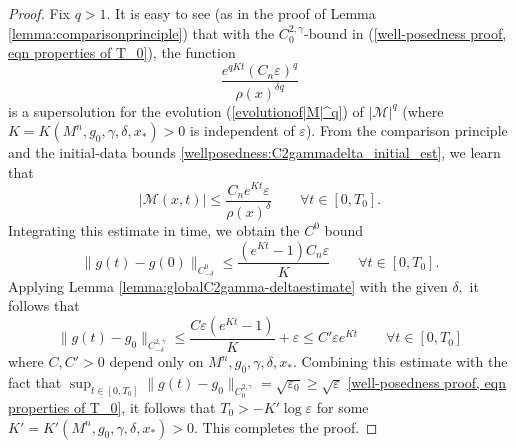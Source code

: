 \documentclass[12pt]{amsart}
\newcommand{\calM}{\mathcal{M}}
\newcommand{\LB}{\left[}
\newcommand{\RB}{\right]}
\renewcommand{\1}{{\mathbf 1}}
\newcommand{\eps}{{\varepsilon}}
\theoremstyle{others}
\numberwithin{equation}{section}
\begin{document}
\begin{proof}
    Fix $q > 1.$ It is easy to see (as in the proof of Lemma \ref{lemma:comparisonprinciple}) that with the $C^{2, \gamma}_0$-bound in (\ref{well-posedness proof, eqn properties of T_0}), the function
        $$\frac{e^{q Kt} (C_n\eps)^q}{\rho(x)^{\delta q }}$$
    is a supersolution for the evolution (\ref{evolutionof|M|^q}) of $|\mathcal{M}|^q$ (where $K = K( M^n, g_0, \gamma, \delta, x_*) > 0$ is independent of $\eps$).
    From the comparison principle and the initial-data bounds \eqref{wellposedness:C2gammadelta_initial_est}, we learn that
        $$| \calM (x,t)| \leq \frac{C_n e^{Kt} \eps}{\rho(x)^{\delta}} \qquad \forall t \in [0, T_0].$$
    Integrating this estimate in time, we obtain the $C^0$ bound
    \begin{equation}\label{wellposedness:C0deltabound}
        \|g(t) - g(0) \|_{C^0_{-\delta}} \leq \frac{\left( e^{Kt} - 1 \right) C_n \eps}{K}
        \qquad \forall t \in [0, T_0].
    \end{equation}
    Applying Lemma \ref{lemma:globalC2gamma-deltaestimate} with the given $\delta,$ it follows that
        $$\| g(t) - g_0 \|_{C^{2, \gamma}_{-\delta} } \le \frac{C \eps ( e^{Kt} - 1) }{K} + \eps \le C' \eps e^{Kt} \qquad \forall t \in [0, T_0]$$
    where $C, C' > 0$ depend only on $M^n, g_0, \gamma, \delta, x_*$.
    Combining this estimate with the fact that $\sup_{t \in [0, T_0]} \| g(t) - g_0 \|_{C^{2, \gamma}_0} = \sqrt{\eps_0} \ge \sqrt{\eps}$ \eqref{well-posedness proof, eqn properties of T_0}, it follows that $ T_0 > - K' \log \eps$ for some $K' = K'(M^n, g_0, \gamma, \delta , x_*) > 0$.
    This completes the proof.
\end{proof}
\end{document}
